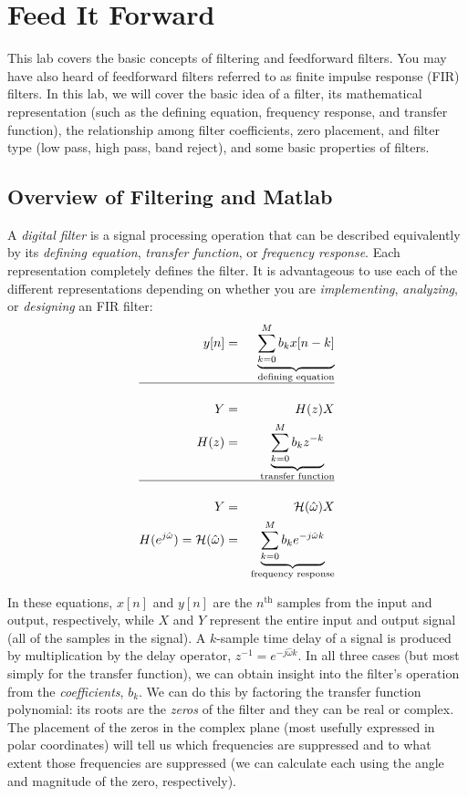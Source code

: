 
\section{Feed It Forward}

This lab covers the basic concepts of filtering and feedforward filters. 
You may have also heard of feedforward filters referred to as 
finite impulse response (FIR) filters. In this lab, we will cover the basic idea
of a filter, its mathematical representation (such as the defining equation,
frequency response, and transfer function), the relationship among
filter coefficients, zero placement, and filter type (low pass, high
pass, band reject), and some basic properties of filters.


\subsection{Overview of Filtering and Matlab}

A \emph{digital filter} is a signal processing operation that can be
  described equivalently by its \emph{defining
  equation}, \emph{transfer function}, or \emph{frequency response}. 
  Each representation completely defines the filter. It is advantageous 
  to use each of the different representations depending on whether you are
  \emph{implementing}, \emph{analyzing}, or \emph{designing} an FIR filter:
\begin{eqnarray*}
  y[n] &=& \underbrace{\sum_{k=0}^M b_k x[n-k]}_{\text{defining equation}} \\ 
  \hline \\
  Y &=& H(z) X\\
  H(z) &=& \underbrace{\sum_{k=0}^M b_k z^{-k}}_{ \text{transfer function} } \\
  \hline \\
  Y &=&  \mathcal{H}({\hat{\omega}}) X \\
  H(e^{j\hat{\omega}})  = \mathcal{H}({\hat{\omega}}) 
  &=& \underbrace{\sum_{k=0}^M b_k e^{-j \hat{\omega}k}}_{\text{frequency response}} 
\end{eqnarray*}

In these equations, $x[n]$ and $y[n]$ are the $n^\mathrm{th}$ samples
from the input and output, respectively, while $X$ and $Y$ represent
the entire input and output signal (all of the samples in the
signal). A $k$-sample time delay of a signal is produced by
multiplication by the delay operator, $z^{-1} = e^{-j
  \hat{\omega}k}$. In all three cases (but most simply for the
transfer function), we can obtain insight into the filter's operation
from the \emph{coefficients}, $b_k$. We can do this by factoring the
transfer function polynomial: its roots are the \emph{zeros} of the
filter and they can be real or complex.  The placement of the zeros in
the complex plane (most usefully expressed in polar coordinates) will
tell us which frequencies are suppressed and to what extent those
frequencies are suppressed (we can calculate each using the angle and
magnitude of the zero, respectively).

